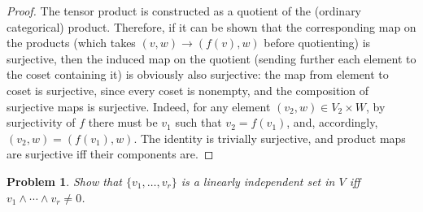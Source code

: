 \documentclass{article}
\newtheorem{plm}{Problem}
\begin{document}
\begin{proof}
  The tensor product is constructed as a quotient of the (ordinary categorical) product.
  Therefore, if it can be shown that the corresponding map on the products (which takes $(v, w) \to (f(v), w)$ before quotienting)
  is surjective, then the induced map on the quotient (sending further each element to the coset containing it) is obviously also surjective:
  the map from element to coset is surjective, since every coset is nonempty, and the composition of surjective maps is surjective.
  Indeed, for any element $(v_{2}, w) \in V_{2} \times W$, by surjectivity of $f$ there must be $v_{1}$ such that $v_{2} = f(v_{1})$,
  and, accordingly, $(v_{2}, w) = (f(v_{1}), w)$.
  The identity is trivially surjective, and product maps are surjective iff their components are.
\end{proof}

\begin{plm}
  Show that $\{v_{1}, \ldots, v_{r}\}$ is a linearly independent set in $V$ iff $v_{1} \land \cdots \land v_{r} \neq 0$.
\end{plm}
\end{document}
